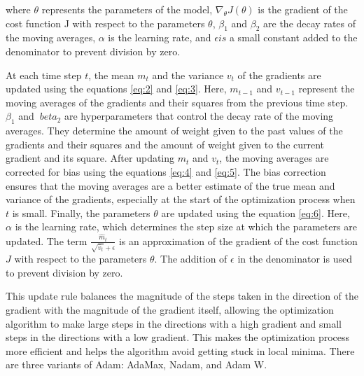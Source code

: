 

where $\theta$ represents the parameters of the model, $\nabla_{\theta} J(\theta)$ is the gradient of the cost function J with respect to the parameters $\theta$, $\beta_1$ and $\beta_2$ are the decay rates of the moving averages, $\alpha$ is the learning rate, and $\epsilon is$ a small constant added to the denominator to prevent division by zero.

\hspace{1cm}

At each time step $t$, the mean $m_t$ and the variance $v_t$ of the gradients are updated using the equations \eqref{eq:2} and \eqref{eq:3}. Here, $m_{t-1}$ and $v_{t-1}$ represent the moving averages of the gradients and their squares from the previous time step. $\beta_1$ and $\ beta_2$ are hyperparameters that control the decay rate of the moving averages. They determine the amount of weight given to the past values of the gradients and their squares and the amount of weight given to the current gradient and its square.
After updating $m_t$ and $v_t$, the moving averages are corrected for bias using the equations \eqref{eq:4} and \eqref{eq:5}. The bias correction ensures that the moving averages are a better estimate of the true mean and variance of the gradients, especially at the start of the optimization process when $t$ is small.
Finally, the parameters $\theta$ are updated using the equation \eqref{eq:6}. Here, $\alpha$ is the learning rate, which determines the step size at which the parameters are updated. The term $\frac{\hat{m}_t}{\sqrt{\hat{v}_t} + \epsilon}$ is an approximation of the gradient of the cost function $J$ with respect to the parameters $\theta$. The addition of $\epsilon$ in the denominator is used to prevent division by zero.

This update rule balances the magnitude of the steps taken in the direction of the gradient with the magnitude of the gradient itself, allowing the optimization algorithm to make large steps in the directions with a high gradient and small steps in the directions with a low gradient. This makes the optimization process more efficient and helps the algorithm avoid getting stuck in local minima.
There are three variants of Adam: AdaMax, Nadam, and Adam W.